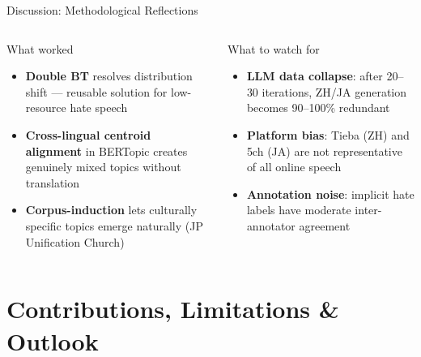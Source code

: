 \documentclass[aspectratio=169,10pt]{beamer}
\begin{document}
\begin{frame}{Discussion: Methodological Reflections}
  \begin{columns}[T]
      \begin{block}{What worked}
        \small
        \begin{itemize}
          \item \textbf{Double BT} resolves distribution shift --- reusable solution for low-resource hate speech
          \item \textbf{Cross-lingual centroid alignment} in BERTopic creates genuinely mixed topics without translation
          \item \textbf{Corpus-induction} lets culturally specific topics emerge naturally (JP Unification Church)
        \end{itemize}
      \end{block}
      \begin{alertblock}{What to watch for}
        \small
        \begin{itemize}
          \item \textbf{LLM data collapse}: after 20--30 iterations, ZH/JA generation becomes 90--100\% redundant
          \item \textbf{Platform bias}: Tieba (ZH) and 5ch (JA) are not representative of all online speech
          \item \textbf{Annotation noise}: implicit hate labels have moderate inter-annotator agreement
        \end{itemize}
      \end{alertblock}
  \end{columns}
\end{frame}

\section{Contributions, Limitations \& Outlook}
\end{document}
